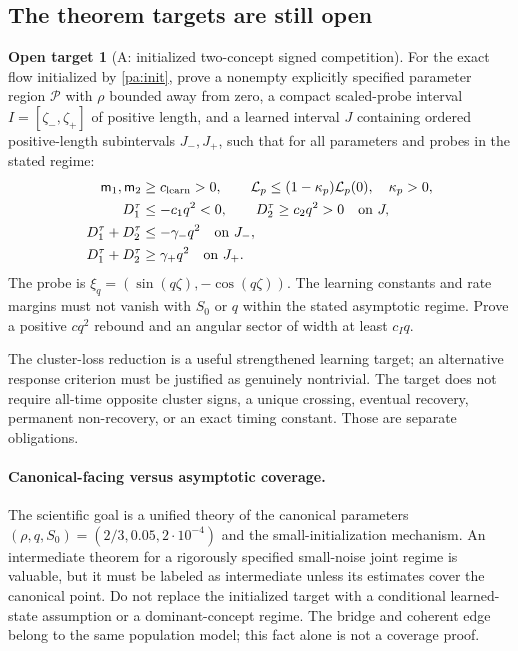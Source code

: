 \documentclass[11pt]{article}
\numberwithin{equation}{section}
\theoremstyle{definition}
\newtheorem{target}{Open target}[section]
\theoremstyle{remark}
\newcommand{\1}{\mathbf 1}
\begin{document}
\subsection{The theorem targets are still open}
\begin{target}[A: initialized two-concept signed competition]\label{pa:targetA}
For the exact flow initialized by \eqref{pa:init}, prove a nonempty explicitly
specified parameter region $\mathcal P$ with $\rho$ bounded away from zero,
a compact scaled-probe interval $I=[\zeta_-,\zeta_+]$ of positive length,
and a learned interval $J$ containing ordered positive-length subintervals
$J_-,J_+$, such that for all parameters and probes in the stated regime:
\begin{align*}
 \mathsf m_1,\mathsf m_2&\ge c_{\rm learn}>0,\qquad
 \mathcal L_p\le(1-\kappa_p)\mathcal L_p(0),\quad \kappa_p>0,\\
 D_1^\tau&\le-c_1q^2<0,\qquad D_2^\tau\ge c_2q^2>0\quad\text{on }J,\\
 D_1^\tau+D_2^\tau&\le-\gamma_-q^2\quad\text{on }J_-,\\
 D_1^\tau+D_2^\tau&\ge\gamma_+q^2\quad\text{on }J_+.
\end{align*}
The probe is $\xi_q=(\sin(q\zeta),-\cos(q\zeta))$.
The learning constants and rate margins must not vanish with $S_0$ or $q$
within the stated asymptotic regime. Prove a positive $cq^2$ rebound and
an angular sector of width at least $c_Iq$.
\end{target}
The cluster-loss reduction is a useful strengthened learning target; an
alternative response criterion must be justified as genuinely nontrivial.
The target does not require all-time opposite cluster signs, a unique
crossing, eventual recovery, permanent non-recovery, or an exact timing
constant. Those are separate obligations.

\paragraph{Canonical-facing versus asymptotic coverage.}
The scientific goal is a unified theory of the canonical parameters
$(\rho,q,S_0)=(2/3,0.05,2\cdot10^{-4})$ and the small-initialization
mechanism. An intermediate theorem for a rigorously specified small-noise
joint regime is valuable, but it must be labeled as intermediate unless
its estimates cover the canonical point. Do not replace the initialized
target with a conditional learned-state assumption or a dominant-concept
regime. The bridge and coherent edge belong to the same population model;
this fact alone is not a coverage proof.
\end{document}
